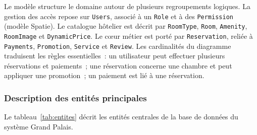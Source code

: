 \documentclass[12pt, a4paper]{report}
\begin{document}
Le modèle structure le domaine autour de plusieurs regroupements logiques.
La gestion des accès repose sur \texttt{Users}, associé à un \texttt{Role} et à des
\texttt{Permission} (modèle Spatie).
Le catalogue hôtelier est décrit par \texttt{RoomType}, \texttt{Room}, \texttt{Amenity},
\texttt{RoomImage} et \texttt{DynamicPrice}.
Le cœur métier est porté par \texttt{Reservation}, reliée à \texttt{Payments},
\texttt{Promotion}, \texttt{Service} et \texttt{Review}.
Les cardinalités du diagramme traduisent les règles essentielles~: un utilisateur
peut effectuer plusieurs réservations et paiements~; une réservation concerne une
chambre et peut appliquer une promotion~; un paiement est lié à une réservation.

\subsubsection{Description des entités principales}

Le tableau~\ref{tab:entites} décrit les entités centrales de la base de données
du système Grand Palais.
\end{document}
